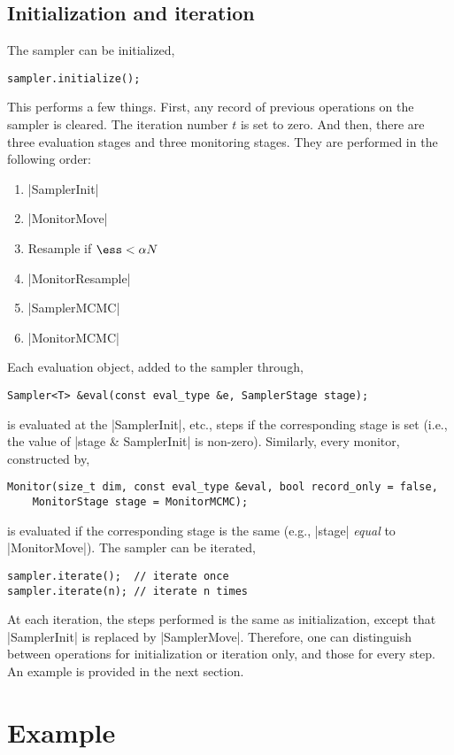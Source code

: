 \subsection{Initialization and iteration}
\label{sub:Initialization and iteration}

The sampler can be initialized,
\begin{verbatim}
sampler.initialize();
\end{verbatim}
This performs a few things. First, any record of previous operations on the
sampler is cleared. The iteration number $t$ is set to zero. And then, there
are three evaluation stages and three monitoring stages. They are performed in
the following order:

\begin{enumerate}
  \item |SamplerInit|
  \item |MonitorMove|
  \item Resample if $\ess < \alpha N$
  \item |MonitorResample|
  \item |SamplerMCMC|
  \item |MonitorMCMC|
\end{enumerate}

Each evaluation object, added to the sampler through,
\begin{verbatim}
Sampler<T> &eval(const eval_type &e, SamplerStage stage);
\end{verbatim}
is evaluated at the |SamplerInit|, etc., steps if the corresponding stage is
set (i.e., the value of |stage & SamplerInit| is non-zero). Similarly, every
monitor, constructed by,
\begin{verbatim}
Monitor(size_t dim, const eval_type &eval, bool record_only = false,
    MonitorStage stage = MonitorMCMC);
\end{verbatim}
is evaluated if the corresponding stage is the same (e.g., |stage| \emph{equal}
to |MonitorMove|). The sampler can be iterated,
\begin{verbatim}
sampler.iterate();  // iterate once
sampler.iterate(n); // iterate n times
\end{verbatim}
At each iteration, the steps performed is the same as initialization, except
that |SamplerInit| is replaced by |SamplerMove|. Therefore, one can distinguish
between operations for initialization or iteration only, and those for every
step. An example is provided in the next section.

\section{Example}
\label{sec:Example (PF)}

